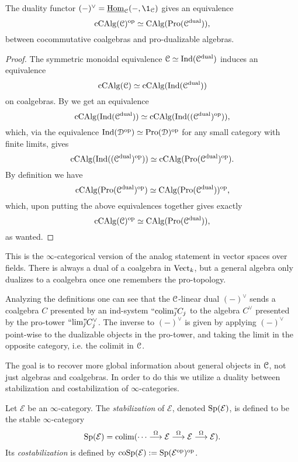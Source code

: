 \begin{lemma}
    \label{ch2:lm:sweedler-duality}
    The duality functor $(-)^\vee = \iHom_\C(-,\1_\C)$ gives an equivalence 
    \[\operatorname{cCAlg}(\EuScript{C})^{\mathrm{op}}\simeq \operatorname{CAlg}(\operatorname{Pro}(\EuScript{C}^{\mathrm{dual}})),\]
    between cocommutative coalgebras and pro-dualizable algebras.
\end{lemma}
\begin{proof}
    The symmetric monoidal equivalence $\EuScript{C}\simeq \operatorname{Ind}(\EuScript{C}^{\mathrm{dual}})$ induces an equivalence 
    \[\operatorname{cCAlg}(\EuScript{C}) \simeq \operatorname{cCAlg}(\operatorname{Ind}(\EuScript{C}^{\mathrm{dual}}))\]
    on coalgebras. By \cite[3.2.4]{lurie_2018_ELL1} we get an equivalence 
    \[\operatorname{cCAlg}(\operatorname{Ind}(\EuScript{C}^{\mathrm{dual}}))\simeq \operatorname{cCAlg}(\operatorname{Ind}((\EuScript{C}^{\mathrm{dual}})^{\mathrm{op}})),\]
    which, via the equivalence $\operatorname{Ind}(\EuScript{D}^{\mathrm{op}})\simeq \operatorname{Pro}(\EuScript{D})^{\mathrm{op}}$ for any small category with finite limits, gives 
    \[\operatorname{cCAlg}(\operatorname{Ind}((\EuScript{C}^{\mathrm{dual}})^{\mathrm{op}}))\simeq \operatorname{cCAlg}(\operatorname{Pro}(\EuScript{C}^{\mathrm{dual}})^{\mathrm{op}}).\]
    By definition we have 
    \[\operatorname{cCAlg}(\operatorname{Pro}(\EuScript{C}^{\mathrm{dual}})^{\mathrm{op}})\simeq \operatorname{CAlg}(\operatorname{Pro}(\EuScript{C}^{\mathrm{dual}}))^{\mathrm{op}},\]
    which, upon putting the above equivalences together gives exactly 
    \[\operatorname{cCAlg}(\EuScript{C})^{\mathrm{op}}\simeq \operatorname{CAlg}(\operatorname{Pro}(\EuScript{C}^{\mathrm{dual}})),\]
    as wanted. 
\end{proof}

\begin{remark}
    This is the $\infty$-categorical version of the analog statement in vector spaces over fields. There is always a dual of a coalgebra in $\mathrm{Vect}_k$, but a general algebra only dualizes to a coalgebra once one remembers the pro-topology. 
\end{remark}

\begin{remark}
    \label{ch2:rm:coalebra-in-Ind}
    Analyzing the definitions one can see that the $\EuScript{C}$-linear dual $(-)^\vee$ sends a coalgebra $C$ presented by an ind-system $``\!\operatorname{colim}\!"_{\hspace{-5pt} j} C_j$ to the algebra $C^\vee$ presented by the pro-tower $``\!\lim\!"_{\hspace{-5pt} j} C_j^\vee$. The inverse to $(-)^\vee$ is given by applying $(-)^\vee$ point-wise to the dualizable objects in the pro-tower, and taking the limit in the opposite category, i.e. the colimit in $\EuScript{C}$. 
\end{remark}

The goal is to recover more global information about general objects in $\EuScript{C}$, not just algebras and coalgebras. In order to do this we utilize a duality between stabilization and costabilization of $\infty$-categories. 

\begin{definition}
    Let $\mathcal{E}$ be an $\infty$-category. The \emph{stabilization} of $\mathcal{E}$, denoted $\mathrm{Sp}(\mathcal{E})$, is defined to be the stable $\infty$-category 
    \[\mathrm{Sp}(\mathcal{E}) = \operatorname{colim} (\cdots\overset{\Omega}{\longrightarrow}\mathcal{E}\overset{\Omega}{\longrightarrow}\mathcal{E}\overset{\Omega}{\longrightarrow}\mathcal{E}).\] 
    Its \emph{costabilization} is defined by $\mathrm{coSp}(\mathcal{E}):= \mathrm{Sp}(\mathcal{E}^{\mathrm{op}})^{\mathrm{op}}$. 
\end{definition}

